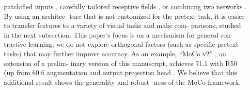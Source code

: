 \documentclass[10pt,twocolumn]{article}  %
\begin{document}
patchiﬁed inputs \cite{46_oord2018representation, 35_henaff2019data}, carefully tailored receptive ﬁelds
\cite{2_bachman2019learning}, or combining two networks \cite{56_tian2019contrastive}. By using an architec-
ture that is not customized for the pretext task, it is easier to
transfer features to a variety of visual tasks and make com-
parisons, studied in the next subsection.
This paper's focus is on a mechanism for general con-
trastive learning; we do not explore orthogonal factors (such
as speciﬁc pretext tasks) that may further improve accuracy.
As an example, “MoCo v2” \cite{8_chen2020improved}, an extension of a prelim-
inary version of this manuscript, achieves 71.1%
with R50 (up from 60.6%
augmentation and output projection head \cite{7_chen2020simple}. We believe
that this additional result shows the generality and robust-
ness of the MoCo framework.
\end{document}
